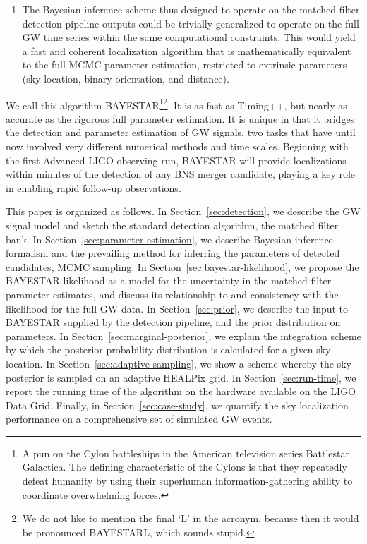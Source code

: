 \documentclass[amsmath,amssymb,aps,prx,reprint,nopreprintnumbers,nofootinbib]{revtex4-1}
\begin{document}
\begin{enumerate}
    \item The Bayesian inference scheme thus designed to operate on the matched\nobreakdashes-filter detection pipeline outputs could be trivially generalized to operate on the full \ac{GW} time series within the same computational constraints. This would yield a fast and coherent localization algorithm that is mathematically equivalent to the full \ac{MCMC} parameter estimation, restricted to extrinsic parameters (sky location, binary orientation, and distance).
\end{enumerate}
%
We call this algorithm \ac{BAYESTAR}\footnote{A pun on the Cylon battleships in the American television series Battlestar Galactica. The defining characteristic of the Cylons is that they repeatedly defeat humanity by using their superhuman information\nobreakdashes-gathering ability to coordinate overwhelming forces.}\footnote{We do not like to mention the final `L' in the acronym, because then it would be pronounced BAYESTARL, which sounds stupid.}. It is as fast as Timing++, but nearly as accurate as the rigorous full parameter estimation. It is unique in that it bridges the detection and parameter estimation of \ac{GW} signals, two tasks that have until now involved very different numerical methods and time scales. Beginning with the first Advanced \acs{LIGO} observing run, \ac{BAYESTAR} will provide localizations within minutes of the detection of any \ac{BNS} merger candidate, playing a key role in enabling rapid follow-up observations.

This paper is organized as follows. In Section~\ref{sec:detection}, we describe the \ac{GW} signal model and sketch the standard detection algorithm, the matched filter bank. In Section~\ref{sec:parameter-estimation}, we describe Bayesian inference formalism and the prevailing method for inferring the parameters of detected candidates, \ac{MCMC} sampling. In Section~\ref{sec:bayestar-likelihood}, we propose the \ac{BAYESTAR} likelihood as a model for the uncertainty in the matched\nobreakdashes-filter parameter estimates, and discuss its relationship to and consistency with the likelihood for the full \ac{GW} data. In Section~\ref{sec:prior}, we describe the input to \ac{BAYESTAR} supplied by the detection pipeline, and the prior distribution on parameters. In Section~\ref{sec:marginal-posterior}, we explain the integration scheme by which the posterior probability distribution is calculated for a given sky location. In Section~\ref{sec:adaptive-sampling}, we show a scheme whereby the sky posterior is sampled on an adaptive HEALPix grid. In Section~\ref{sec:run-time}, we report the running time of the algorithm on the hardware available on the \ac{LIGO} Data Grid. Finally, in Section~\ref{sec:case-study}, we quantify the sky localization performance on a comprehensive set of simulated \ac{GW} events.
\end{document}
